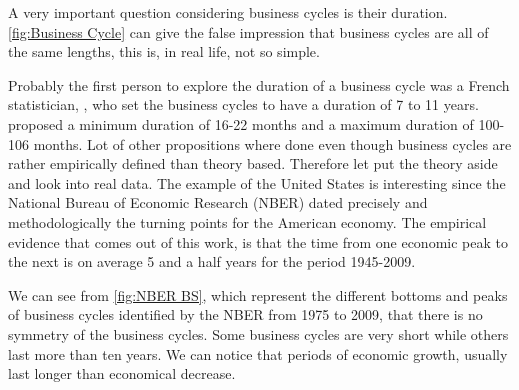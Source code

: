 \documentclass[12pt,a4paper,oneside]{book}
\begin{document}
A very important question considering business cycles is their duration.
\autoref{fig:Business Cycle} can give the false impression that business cycles are all of the same lengths, this is, in real life, not so simple.

Probably the first person to explore the duration of a business cycle was a French statistician,  \cite{juglar_crises_1862}, who set the business cycles to have a duration of 7 to 11 years.
\cite{mitchell_measuring_1946} proposed a minimum duration of 16-22 months and a maximum duration of 100-106 months.
Lot of other propositions where done even though business cycles are rather empirically defined than theory based.
Therefore let put the theory aside and look into real data.
The example of the United States is interesting since the National Bureau of Economic Research (NBER) dated precisely and methodologically the turning points for the American economy. The empirical evidence that comes out of this work, is that the time from one economic peak to the next is on average 5 and a half years for the period 1945-2009.

We can see from \autoref{fig:NBER BS}, which represent the different bottoms and peaks of business cycles identified by the NBER from 1975 to 2009, that there is no symmetry of the business cycles. Some business cycles are very short while others last more than ten years.
We can notice that periods of economic growth, usually last longer than economical decrease.
\end{document}
